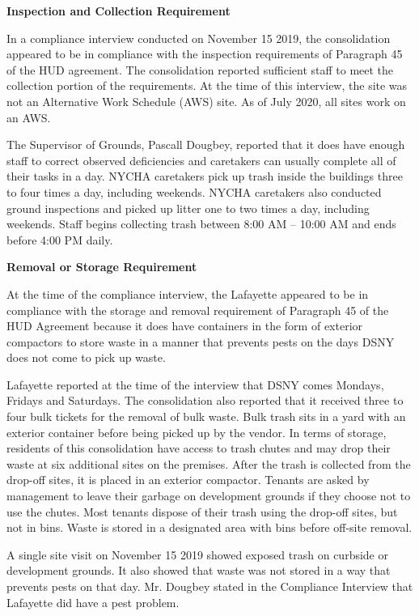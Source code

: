 

\textbf{Inspection and Collection Requirement}

In a compliance interview conducted on November 15 2019, the consolidation appeared to be in compliance with the inspection requirements of Paragraph 45 of the HUD agreement. The consolidation reported sufficient staff to meet the collection portion of the requirements. At the time of this interview, the site was not an Alternative Work Schedule (AWS) site. As of July 2020, all sites work on an AWS.

The Supervisor of Grounds, Pascall Dougbey, reported that it does have enough staff to correct observed deficiencies and caretakers can usually complete all of their tasks in a day. NYCHA caretakers pick up trash inside the buildings three to four times a day, including weekends. NYCHA caretakers also conducted ground inspections and picked up litter one to two times a day, including weekends. Staff begins collecting trash between 8:00 AM -- 10:00 AM and ends before 4:00 PM daily. 

\textbf{Removal or Storage Requirement}

At the time of the compliance interview, the Lafayette appeared to be in compliance with the storage and removal requirement of Paragraph 45 of the HUD Agreement because it does have containers in the form of exterior compactors to store waste in a manner that prevents pests on the days DSNY does not come to pick up waste.

Lafayette reported at the time of the interview that DSNY comes Mondays, Fridays and Saturdays. The consolidation also reported that it received three to four bulk tickets for the  removal of bulk waste. Bulk trash sits in a yard with an exterior container before being picked up by the vendor. In terms of storage, residents of this consolidation have access to trash chutes and may drop their waste at six additional sites on the premises. After the trash is collected from the drop-off sites, it is placed in an exterior compactor. Tenants are asked by management to leave their garbage on development grounds if they choose not to use the chutes. Most tenants dispose of their trash using the drop-off sites, but not in bins. Waste is stored in a designated area with bins before off-site removal. 

A single site visit on November 15 2019 showed exposed trash on curbside or development grounds. It also showed that waste was not stored in a way that prevents pests on that day. Mr. Dougbey stated in the Compliance Interview that Lafayette did have a pest problem.

